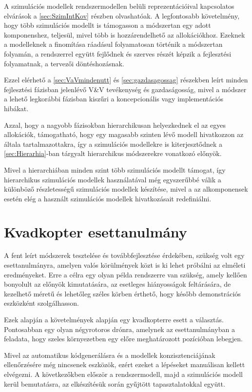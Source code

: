        A szimulációs modellek rendszermodellen belüli reprezentációival kapcsolatos elvárások a \ref{sec:SzimIntKov} részben olvashatóak. A legfontosabb követelmény, hogy több szimulációs modellt is támogasson a módszertan egy adott komponenshez, teljesül, mivel több is hozzárendelhető az allokációkhoz.
        Ezeknek a modelleknek a finomítása ráadásul folyamatosan történik a módszertan folyamán, a rendszerrel együtt fejlődnek és szerves részét képzik a fejlesztési folyamatnak, a tervezői döntéshozásnak.
        
        Ezzel elérhető a \ref{sec:VaVmindenutt} és \ref{sec:gazdasagossag} részekben leírt minden fejlesztési fázisban jelenlévő V\&V tevékenység és gazdaságosság, mivel a módszer a lehető legkorábbi fázisban kiszűri a koncepcionális vagy implementációs hibákat.

        Azzal, hogy a nagyobb fázisokban hierarchikusan helyezkednek el az egyes allokációk, támogatható, hogy egy magasabb szinten lévő modell hivatkozzon az általa tartalmazottakra, így a szimulációs modellekre is kiterjesztődnek a \ref{sec:Hierarhia}-ban tárgyalt hierarchikus módszerekre vonatkozó előnyök.
        
        Mivel a hierarchiában minden szint több szimulációs modellt támogat, így hierarchikus szimulációs modellek használatával még egyszerűbbé válik a különböző részletességű szimulációs modellek készítése, mivel a az alkomponensek esetén elég a használt szimulációs modellek hivatkozásait redefiniálni.

\section{Kvadkopter esettanulmány}
A fent leírt módszerek tesztelése és továbbfejlesztése érdekében, szükség volt egy esettanulmányra, amelyen valós körülmények közt is ki lehet próbálni az elméleti eredményeket.
Erre a célra egy olyan példa rendszerre van szükség, amely kellően bonyolult az előnyök kimutatására, az esetleges hiányosságok feltárására, de kezelhető méretű és lehetőleg széles körben érthető, hogy később demonstrációs eszközként szolgálhasson.

Ezek alapján a követelmények alapján egy kvadkopterre esett a választás. Pontosabban egy olyan négyrotoros drónra, amelynek az esettanulmányban a feladata, hogy szeles környezetben egy előre meghatározott pozícióban lebegjen.

Mivel az automatikus kódgenerálásra és a modellek konzisztenciájának ellenőrzésére még nincsenek eszközök, ezért ezeket a lépéseket manuálisan kellett elvégezni.
A következőkben először a rendszermodell, majd a szimulációs modell kerül bemutatásra, az elkészítésük során gyűjtött tapasztalatokkal együtt.

